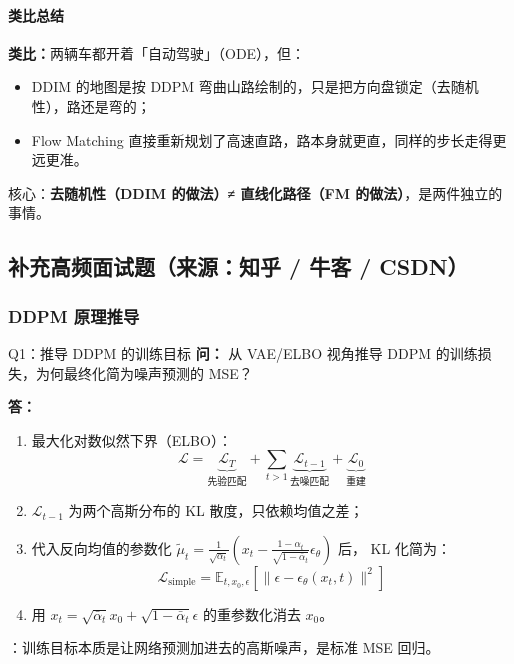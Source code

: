 \paragraph{类比总结}

\begin{intubox}
\textbf{类比：}两辆车都开着「自动驾驶」（ODE），但：
\begin{itemize}
  \item DDIM 的地图是按 DDPM 弯曲山路绘制的，只是把方向盘锁定（去随机性），路还是弯的；
  \item Flow Matching 直接重新规划了高速直路，路本身就更直，同样的步长走得更远更准。
\end{itemize}
核心：\textbf{去随机性（DDIM 的做法）≠ 直线化路径（FM 的做法）}，是两件独立的事情。
\end{intubox}

\subsection{补充高频面试题（来源：知乎 / 牛客 / CSDN）}

\subsubsection{DDPM 原理推导}

\begin{conceptbox}{Q1：推导 DDPM 的训练目标}
\textbf{问：} 从 VAE/ELBO 视角推导 DDPM 的训练损失，为何最终化简为噪声预测的 MSE？

\textbf{答：}
\begin{enumerate}
  \item 最大化对数似然下界（ELBO）：
    \[
      \mathcal{L} = \underbrace{\mathcal{L}_T}_{\text{先验匹配}} + \sum_{t>1}\underbrace{\mathcal{L}_{t-1}}_{\text{去噪匹配}} + \underbrace{\mathcal{L}_0}_{\text{重建}}
    \]
  \item $\mathcal{L}_{t-1}$ 为两个高斯分布的 KL 散度，只依赖均值之差；
  \item 代入反向均值的参数化 $\tilde{\mu}_t = \frac{1}{\sqrt{\alpha_t}}\!\left(x_t - \frac{1-\alpha_t}{\sqrt{1-\bar\alpha_t}}\epsilon_\theta\right)$ 后，
    KL 化简为：
    \[
      \mathcal{L}_{\text{simple}} = \mathbb{E}_{t,x_0,\epsilon}\!\left[\|\epsilon - \epsilon_\theta(x_t,t)\|^2\right]
    \]
  \item 用 $x_t = \sqrt{\bar\alpha_t}x_0 + \sqrt{1-\bar\alpha_t}\epsilon$ 的重参数化消去 $x_0$。
\end{enumerate}
：训练目标本质是让网络预测加进去的高斯噪声，是标准 MSE 回归。
\end{conceptbox}

